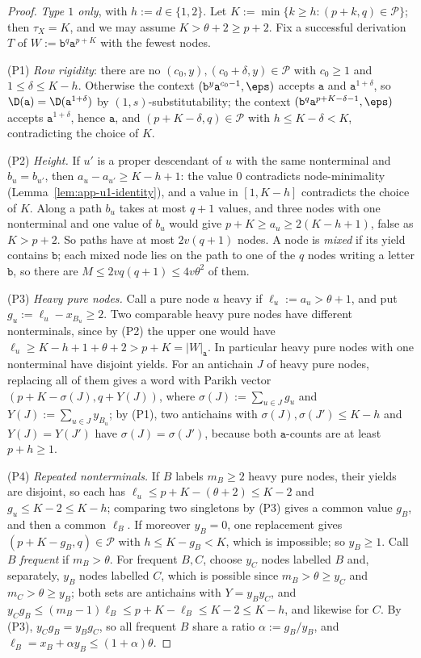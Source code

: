 \begin{proof}
\emph{Type $1$ only}, with $h:=d\in\{1,2\}$.  Let $K:=\min\{k\ge h:(p+k,q)\in\mathcal P\}$;
then $\tau_X=K$, and we may assume $K>\theta+2\ge p+2$.  Fix a successful derivation
$T$ of $W:=\mathtt b^q\mathtt a^{p+K}$ with the fewest nodes.

(P1) \emph{Row rigidity}: there are no $(c_0,y),(c_0+\delta,y)\in\mathcal P$ with
$c_0\ge1$ and $1\le\delta\le K-h$.  Otherwise the context
$(\mathtt b^y\mathtt a^{c_0-1},\eps)$ accepts $\mathtt a$ and $\mathtt a^{1+\delta}$, so
$\D(\mathtt a)=\D(\mathtt a^{1+\delta})$ by $(1,s)$-substitutability; the context
$(\mathtt b^q\mathtt a^{p+K-\delta-1},\eps)$ accepts $\mathtt a^{1+\delta}$, hence $\mathtt a$, and
$(p+K-\delta,q)\in\mathcal P$ with $h\le K-\delta<K$, contradicting the choice of $K$.

(P2) \emph{Height.}  If $u'$ is a proper descendant of $u$ with the same nonterminal
and $b_u=b_{u'}$, then $a_u-a_{u'}\ge K-h+1$: the value $0$ contradicts
node-minimality (Lemma~\ref{lem:app-u1-identity}), and a value in $[1,K-h]$
contradicts the choice of $K$.  Along a path $b_u$ takes at most $q+1$ values, and
three nodes with one nonterminal and one value of $b_u$ would give
$p+K\ge a_u\ge2(K-h+1)$, false as $K>p+2$.  So paths have at most $2v(q+1)$ nodes.
A node is \emph{mixed} if its yield contains $\mathtt b$; each mixed node lies on the
path to one of the $q$ nodes writing a letter $\mathtt b$, so there are
$M\le2vq(q+1)\le4v\theta^2$ of them.

(P3) \emph{Heavy pure nodes.}  Call a pure node $u$ heavy if $\ell_u:=a_u>\theta+1$,
and put $g_u:=\ell_u-x_{B_u}\ge2$.  Two comparable heavy pure nodes have different
nonterminals, since by (P2) the upper one would have
$\ell_u\ge K-h+1+\theta+2>p+K=|W|_{\mathtt a}$.  In particular heavy pure nodes with one
nonterminal have disjoint yields.  For an antichain $J$ of heavy pure nodes,
replacing all of them gives a word with Parikh vector
$(p+K-\sigma(J),q+Y(J))$, where $\sigma(J):=\sum_{u\in J}g_u$ and
$Y(J):=\sum_{u\in J}y_{B_u}$; by (P1), two antichains with
$\sigma(J),\sigma(J')\le K-h$ and $Y(J)=Y(J')$ have $\sigma(J)=\sigma(J')$, because
both $\mathtt a$-counts are at least $p+h\ge1$.

(P4) \emph{Repeated nonterminals.}  If $B$ labels $m_B\ge2$ heavy pure nodes, their
yields are disjoint, so each has $\ell_u\le p+K-(\theta+2)\le K-2$ and
$g_u\le K-2\le K-h$; comparing two singletons by (P3) gives a common value $g_B$, and
then a common $\ell_B$.  If moreover $y_B=0$, one replacement gives
$(p+K-g_B,q)\in\mathcal P$ with $h\le K-g_B<K$, which is impossible; so $y_B\ge1$.
Call $B$ \emph{frequent} if $m_B>\theta$.  For frequent $B,C$, choose $y_C$
nodes labelled $B$ and, separately, $y_B$ nodes labelled $C$, which is possible
since $m_B>\theta\ge y_C$ and $m_C>\theta\ge y_B$; both sets are antichains with
$Y=y_By_C$, and
$y_Cg_B\le(m_B-1)\ell_B\le p+K-\ell_B\le K-2\le K-h$, and likewise for $C$.  By (P3),
$y_Cg_B=y_Bg_C$, so all frequent $B$ share a ratio $\alpha:=g_B/y_B$, and
$\ell_B=x_B+\alpha y_B\le(1+\alpha)\theta$.


\end{proof}
